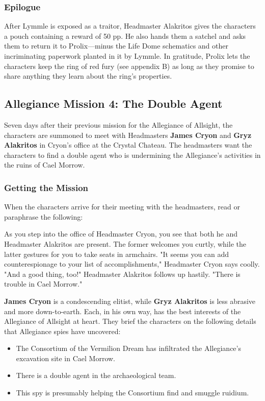 \documentclass[10pt,a4,twoside,twocolumn,openany,nodeprecatedcode]{dndbook}
\begin{document}
\subsubsection{Epilogue}
After Lymmle is exposed as a traitor, Headmaster Alakritos gives the characters a pouch containing a reward of 50 pp. He also hands them a satchel and asks them to return it to Prolix—minus the Life Dome schematics and other incriminating paperwork planted in it by Lymmle.
In gratitude, Prolix lets the characters keep the ring of red fury (see appendix B) as long as they promise to share anything they learn about the ring's properties.
\subsection{Allegiance Mission 4: The Double Agent}
Seven days after their previous mission for the Allegiance of Allsight, the characters are summoned to meet with Headmasters \textbf{James Cryon} and \textbf{Gryz Alakritos} in Cryon's office at the Crystal Chateau. The headmasters want the characters to find a double agent who is undermining the Allegiance's activities in the ruins of Cael Morrow.
\subsubsection{Getting the Mission}
When the characters arrive for their meeting with the headmasters, read or paraphrase the following:
\begin{DndReadAloud}{}
As you step into the office of Headmaster Cryon, you see that both he and Headmaster Alakritos are present. The former welcomes you curtly, while the latter gestures for you to take seats in armchairs.
"It seems you can add counterespionage to your list of accomplishments," Headmaster Cryon says coolly.
"And a good thing, too!" Headmaster Alakritos follows up hastily. "There is trouble in Cael Morrow."
\end{DndReadAloud}

\textbf{James Cryon} is a condescending elitist, while \textbf{Gryz Alakritos} is less abrasive and more down-to-earth. Each, in his own way, has the best interests of the Allegiance of Allsight at heart. They brief the characters on the following details that Allegiance spies have uncovered:
\begin{itemize}

\item The Consortium of the Vermilion Dream has infiltrated the Allegiance's excavation site in Cael Morrow.
\item There is a double agent in the archaeological team.
\item This spy is presumably helping the Consortium find and smuggle ruidium.
\end{itemize}
\end{document}
